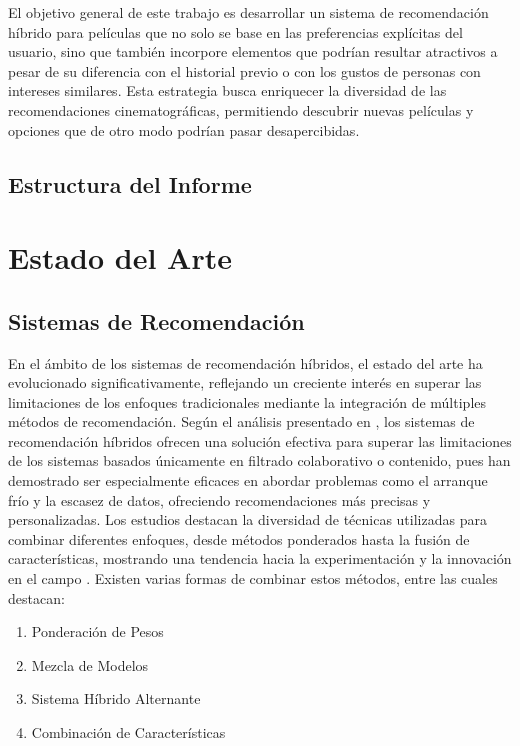 \documentclass[a4paper,12pt]{report}
\begin{document}
    El objetivo general de este trabajo es desarrollar un sistema de recomendación híbrido para películas que no solo se base en las preferencias explícitas del usuario, sino que también incorpore elementos que podrían resultar atractivos a pesar de su diferencia con el historial previo o con los gustos de personas con intereses similares. Esta estrategia busca enriquecer la diversidad de las recomendaciones cinematográficas, permitiendo descubrir nuevas películas y opciones que de otro modo podrían pasar desapercibidas.


    \section{Estructura del Informe}

\chapter{Estado del Arte}
    \section{Sistemas de Recomendación}
    En el ámbito de los sistemas de recomendación híbridos, el estado del arte ha evolucionado significativamente, reflejando un creciente interés en superar las limitaciones de los enfoques tradicionales mediante la integración de múltiples métodos de recomendación. Según el análisis presentado en \cite{hybridRecommenderSystemReview}, los sistemas de recomendación híbridos ofrecen una solución efectiva para superar las limitaciones de los sistemas basados únicamente en filtrado colaborativo o contenido, pues han demostrado ser especialmente eficaces en abordar problemas como el arranque frío y la escasez de datos, ofreciendo recomendaciones más precisas y personalizadas. Los estudios destacan la diversidad de técnicas utilizadas para combinar diferentes enfoques, desde métodos ponderados hasta la fusión de características, mostrando una tendencia hacia la experimentación y la innovación en el campo \cite{recommendationModelsTourism} . 
    Existen varias formas de combinar estos métodos, entre las cuales destacan:
    \begin{enumerate}
        \item Ponderación de Pesos 
        \item Mezcla de Modelos
        \item Sistema Híbrido Alternante
        \item Combinación de Características
        
    \end{enumerate}
\end{document}

